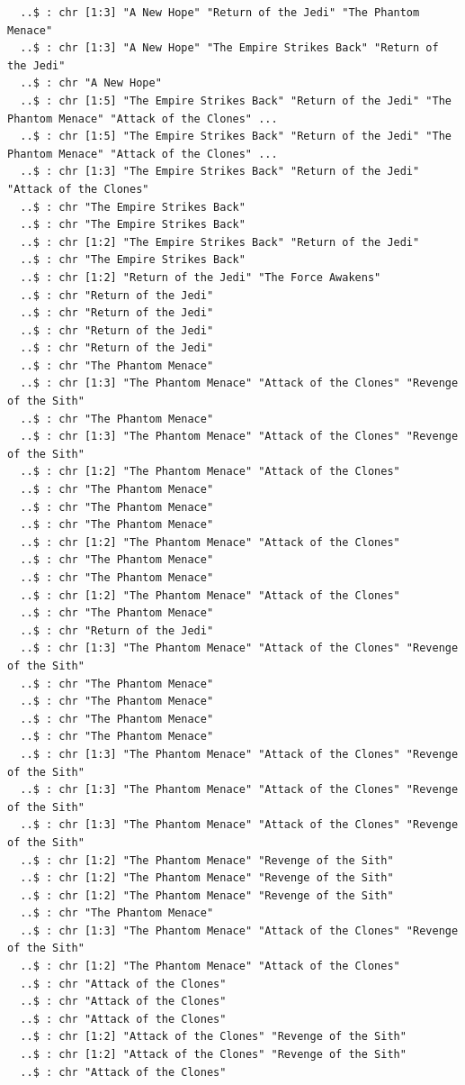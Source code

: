 \documentclass[
  letterpaper,
  DIV=11,
  numbers=noendperiod]{scrreprt}
\begin{document}
\begin{verbatim}
  ..$ : chr [1:3] "A New Hope" "Return of the Jedi" "The Phantom Menace"
  ..$ : chr [1:3] "A New Hope" "The Empire Strikes Back" "Return of the Jedi"
  ..$ : chr "A New Hope"
  ..$ : chr [1:5] "The Empire Strikes Back" "Return of the Jedi" "The Phantom Menace" "Attack of the Clones" ...
  ..$ : chr [1:5] "The Empire Strikes Back" "Return of the Jedi" "The Phantom Menace" "Attack of the Clones" ...
  ..$ : chr [1:3] "The Empire Strikes Back" "Return of the Jedi" "Attack of the Clones"
  ..$ : chr "The Empire Strikes Back"
  ..$ : chr "The Empire Strikes Back"
  ..$ : chr [1:2] "The Empire Strikes Back" "Return of the Jedi"
  ..$ : chr "The Empire Strikes Back"
  ..$ : chr [1:2] "Return of the Jedi" "The Force Awakens"
  ..$ : chr "Return of the Jedi"
  ..$ : chr "Return of the Jedi"
  ..$ : chr "Return of the Jedi"
  ..$ : chr "Return of the Jedi"
  ..$ : chr "The Phantom Menace"
  ..$ : chr [1:3] "The Phantom Menace" "Attack of the Clones" "Revenge of the Sith"
  ..$ : chr "The Phantom Menace"
  ..$ : chr [1:3] "The Phantom Menace" "Attack of the Clones" "Revenge of the Sith"
  ..$ : chr [1:2] "The Phantom Menace" "Attack of the Clones"
  ..$ : chr "The Phantom Menace"
  ..$ : chr "The Phantom Menace"
  ..$ : chr "The Phantom Menace"
  ..$ : chr [1:2] "The Phantom Menace" "Attack of the Clones"
  ..$ : chr "The Phantom Menace"
  ..$ : chr "The Phantom Menace"
  ..$ : chr [1:2] "The Phantom Menace" "Attack of the Clones"
  ..$ : chr "The Phantom Menace"
  ..$ : chr "Return of the Jedi"
  ..$ : chr [1:3] "The Phantom Menace" "Attack of the Clones" "Revenge of the Sith"
  ..$ : chr "The Phantom Menace"
  ..$ : chr "The Phantom Menace"
  ..$ : chr "The Phantom Menace"
  ..$ : chr "The Phantom Menace"
  ..$ : chr [1:3] "The Phantom Menace" "Attack of the Clones" "Revenge of the Sith"
  ..$ : chr [1:3] "The Phantom Menace" "Attack of the Clones" "Revenge of the Sith"
  ..$ : chr [1:3] "The Phantom Menace" "Attack of the Clones" "Revenge of the Sith"
  ..$ : chr [1:2] "The Phantom Menace" "Revenge of the Sith"
  ..$ : chr [1:2] "The Phantom Menace" "Revenge of the Sith"
  ..$ : chr [1:2] "The Phantom Menace" "Revenge of the Sith"
  ..$ : chr "The Phantom Menace"
  ..$ : chr [1:3] "The Phantom Menace" "Attack of the Clones" "Revenge of the Sith"
  ..$ : chr [1:2] "The Phantom Menace" "Attack of the Clones"
  ..$ : chr "Attack of the Clones"
  ..$ : chr "Attack of the Clones"
  ..$ : chr "Attack of the Clones"
  ..$ : chr [1:2] "Attack of the Clones" "Revenge of the Sith"
  ..$ : chr [1:2] "Attack of the Clones" "Revenge of the Sith"
  ..$ : chr "Attack of the Clones"

\end{verbatim}
\end{document}
